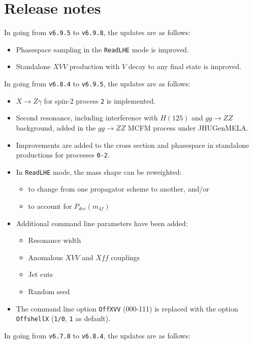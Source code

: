 \documentclass[aps,superscriptaddress,nofootinbib]{revtex4}
\begin{document}

\section{ Release notes }

\noindent
In going from \verb|v6.9.5| to \verb|v6.9.8|, the updates are as follows:

\begin{itemize}
\item Phasespace sampling in the \verb|ReadLHE| mode is improved.
\item Standalone $XVV$ production with $V$ decay to any final state is improved.
\end{itemize}

\noindent
In going from \verb|v6.8.4| to \verb|v6.9.5|, the updates are as follows:

\begin{itemize}
\item $X\to Z\gamma$ for spin-2 process \verb|2| is implemented.
\item Second resonance, including interference with $H(125)$ and $gg\to ZZ$ background, added in the $gg\to ZZ$ MCFM process under JHUGenMELA.
\item Improvements are added to the cross section and phasespace in standalone productions for processes \verb|0-2|.
\item In \verb|ReadLHE| mode, the mass shape can be reweighted:
\begin{itemize}
\item to change from one propagator scheme to another, and/or
\item to account for $P_{dec}(m_{4f})$
\end{itemize}
\item Additional command line parameters have been added:
\begin{itemize}
\item Resonance width
\item Anomalous $XVV$ and $Xff$ couplings
\item Jet cuts
\item Random seed
\end{itemize}
\item The command line option \verb|OffXVV| (000-111) is replaced with the option \verb|OffshellX| (\verb|1/0|, \verb|1| as default).
\end{itemize}

\noindent
In going from \verb|v6.7.8| to \verb|v6.8.4|, the updates are as follows:
\end{document}
